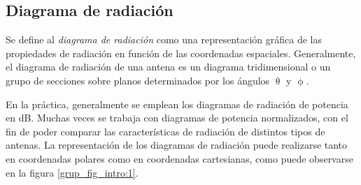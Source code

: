 \subsection{Diagrama de radiación}
\label{subsec_intro_diag_rad}

Se define al \emph{diagrama de radiación} como una representación gráfica de las propiedades de radiación en función de las coordenadas espaciales. Generalmente, el diagrama de radiación de una antena es un diagrama tridimensional o un grupo de secciones sobre planos determinados por los ángulos $\uptheta$ y $\upphi$.

En la práctica, generalmente se emplean los diagramas de radiación de potencia en dB. Muchas veces se trabaja con diagramas de potencia normalizados, con el fin de poder comparar las características de radiación de distintos tipos de antenas. La representación de los diagramas de radiación puede realizarse tanto en coordenadas polares como en coordenadas cartesianas, como puede observarse en la figura \ref{grup_fig_intro:1}.
